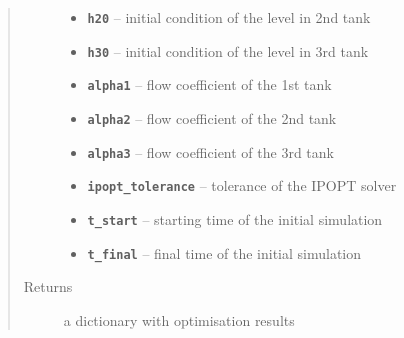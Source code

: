 \documentclass[letterpaper,10pt,english]{sphinxmanual}
\begin{document}
\begin{fulllineitems}
\begin{quote}
\begin{description}
\begin{itemize}
\item {} 
\textbf{\texttt{h20}} -- initial condition of the level in 2nd tank

\item {} 
\textbf{\texttt{h30}} -- initial condition of the level in 3rd tank

\item {} 
\textbf{\texttt{alpha1}} -- flow coefficient of the 1st tank

\item {} 
\textbf{\texttt{alpha2}} -- flow coefficient of the 2nd tank

\item {} 
\textbf{\texttt{alpha3}} -- flow coefficient of the 3rd tank

\item {} 
\textbf{\texttt{ipopt\_tolerance}} -- tolerance of the IPOPT solver

\item {} 
\textbf{\texttt{t\_start}} -- starting time of the initial simulation

\item {} 
\textbf{\texttt{t\_final}} -- final time of the initial simulation

\end{itemize}

\item[{Returns}] \leavevmode
a dictionary with optimisation results

\end{description}\end{quote}

\end{fulllineitems}


\begin{fulllineitems}
\label{ds_tanks.tanks_utils:ds_tanks.tanks_utils.set_model_parameters}
\end{fulllineitems}


\begin{fulllineitems}
\label{ds_tanks.tanks_utils:ds_tanks.tanks_utils.setup_logging}
\end{fulllineitems}
\end{document}
